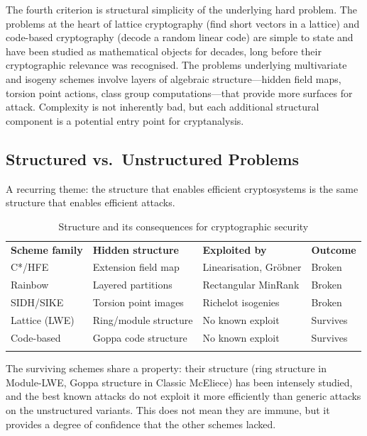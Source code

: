 The fourth criterion is structural simplicity of the underlying hard problem.  The problems at the heart of lattice cryptography (find short vectors in a lattice) and code-based cryptography (decode a random linear code) are simple to state and have been studied as mathematical objects for decades, long before their cryptographic relevance was recognised.  The problems underlying multivariate and isogeny schemes involve layers of algebraic structure---hidden field maps, torsion point actions, class group computations---that provide more surfaces for attack.  Complexity is not inherently bad, but each additional structural component is a potential entry point for cryptanalysis.


\subsection{Structured vs.\ Unstructured Problems}
\label{subsec:structured-unstructured}

A recurring theme: the structure that enables efficient cryptosystems is the same structure that enables efficient attacks.

\begin{table}[t]
\caption{Structure and its consequences for cryptographic security}
\label{tab:structure}
\begin{tabular}{p{2.8cm}p{3cm}p{3cm}p{3cm}}
\hline\noalign{\smallskip}
\textbf{Scheme family} & \textbf{Hidden structure} & \textbf{Exploited by} & \textbf{Outcome} \\
\noalign{\smallskip}\svhline\noalign{\smallskip}
C*/HFE        & Extension field map      & Linearisation, Gr\"obner & Broken \\
Rainbow       & Layered partitions       & Rectangular MinRank       & Broken \\
SIDH/SIKE     & Torsion point images     & Richelot isogenies        & Broken \\
Lattice (LWE) & Ring/module structure     & No known exploit          & Survives \\
Code-based    & Goppa code structure      & No known exploit          & Survives \\
\noalign{\smallskip}\hline
\end{tabular}
\end{table}

The surviving schemes share a property: their structure (ring structure in Module-LWE, Goppa structure in Classic McEliece) has been intensely studied, and the best known attacks do not exploit it more efficiently than generic attacks on the unstructured variants.  This does not mean they are immune, but it provides a degree of confidence that the other schemes lacked.


